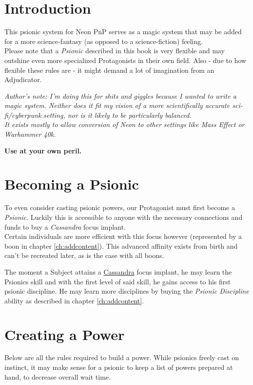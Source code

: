 \documentclass[12pt,a4paper,openany,usenames,dvipsnames]{book}
\begin{document}
	

	\chapter{Introduction}
	This psionic system for Neon PnP serves as a magic system that may be added for a more science-fantasy (as opposed to a science-fiction) feeling.\\
	Please note that a \emph{Psionic} described in this book is very flexible and may outshine even more specialized Protagonists in their own field.
	Also - due to how flexible these rules are - it might demand a lot of imagination from an Adjudicator.

	\begin{exampleblock}
		\itshape
		Author's note: I'm doing this for shits and giggles because I wanted to write a magic system.
		Neither does it fit my vision of a more scientifically accurate sci-fi/cyberpunk setting, nor is it likely to be particularly balanced.\\
		It exists mostly to allow conversion of Neon to other settings like Mass Effect or Warhammer 40k.
		\par
		\textbf{Use at your own peril.}
	\end{exampleblock}

	\chapter{Becoming a Psionic}
	To even consider casting psionic powers, our Protagonist must first become a \emph{Psionic}.
	Luckily this is accessible to anyone with the necessary connections and funds to buy a \emph{Cassandra} focus implant.\\
	Certain individuals are more efficient with this focus however (represented by a boon in chapter \ref{ch:addcontent}). This advanced affinity exists from birth and can't be recreated later, as is the case with all boons. \par
	The moment a Subject attains a \hyperref[implant:cassandrapsi-focus]{Cassandra} focus implant,
		he may learn the Psionics skill and with the first level of said skill,
		he gains access to his first psionic discipline.
	He may learn more disciplines by buying the \emph{Psionic Discipline} ability as described in chapter \ref{ch:addcontent}.

	\chapter{Creating a Power}
	\label{ch:create}
	Below are all the rules required to build a power.
	While psionics freely cast on instinct, it may make sense for a psionic to keep a list of powers prepared at hand, to decrease overall wait time.
\end{document}
